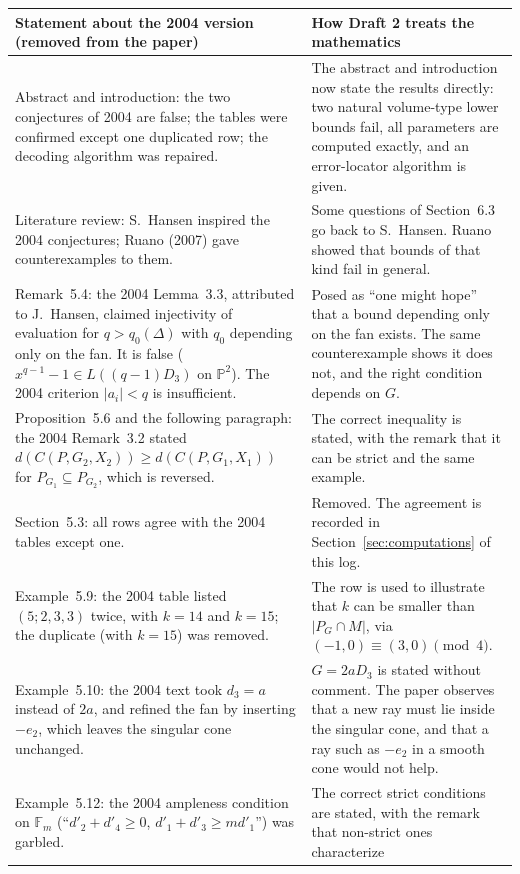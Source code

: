 \documentclass[12pt,letterpaper]{article}
\newcommand{\F}{\mathbb{F}}
\newcommand{\PP}{\mathbb{P}}
\begin{document}
\begin{longtable}{@{}L{0.47\textwidth}L{0.45\textwidth}@{}}
\toprule
Statement about the 2004 version (removed from the paper) & How Draft 2
treats the mathematics\\ \midrule
\endhead
Abstract and introduction: the two conjectures of 2004 are false; the tables
were confirmed except one duplicated row; the decoding algorithm was repaired.
& The abstract and introduction now state the results directly: two natural
volume-type lower bounds fail, all parameters are computed exactly, and an
error-locator algorithm is given.\\
Literature review: S.~Hansen inspired the 2004 conjectures; Ruano (2007) gave
counterexamples to them. & Some questions of Section~6.3 go back to
S.~Hansen. Ruano showed that bounds of that kind fail in general.\\
Remark~5.4: the 2004 Lemma~3.3, attributed to J.~Hansen, claimed injectivity of
evaluation for $q>q_0(\Delta)$ with $q_0$ depending only on the fan. It is
false ($x^{q-1}-1\in L((q-1)D_3)$ on $\PP^2$). The 2004 criterion $|a_i|<q$ is
insufficient. & Posed as ``one might hope'' that a bound depending only on
the fan exists. The same counterexample shows it does not, and the right
condition depends on $G$.\\
Proposition~5.6 and the following paragraph: the 2004 Remark~3.2 stated
$d(C(P,G_2,X_2))\ge d(C(P,G_1,X_1))$ for $P_{G_1}\subseteq P_{G_2}$, which is
reversed. & The correct inequality is stated, with the remark that it can be
strict and the same example.\\
Section~5.3: all rows agree with the 2004 tables except one. & Removed. The
agreement is recorded in Section~\ref{sec:computations} of this log.\\
Example~5.9: the 2004 table listed $(5;2,3,3)$ twice, with $k=14$ and
$k=15$; the duplicate (with $k=15$) was removed. & The row is used to
illustrate that $k$ can be smaller than $|P_G\cap M|$, via
$(-1,0)\equiv(3,0)\pmod4$.\\
Example~5.10: the 2004 text took $d_3=a$ instead of $2a$, and refined the fan
by inserting $-e_2$, which leaves the singular cone unchanged. & $G=2aD_3$ is
stated without comment. The paper observes that a new ray must lie inside the
singular cone, and that a ray such as $-e_2$ in a smooth cone would not
help.\\
Example~5.12: the 2004 ampleness condition on $\F_m$
(``$d'_2+d'_4\ge0$, $d'_1+d'_3\ge md'_1$'') was garbled. & The correct strict
conditions are stated, with the remark that non-strict ones characterize

\end{longtable}
\end{document}
